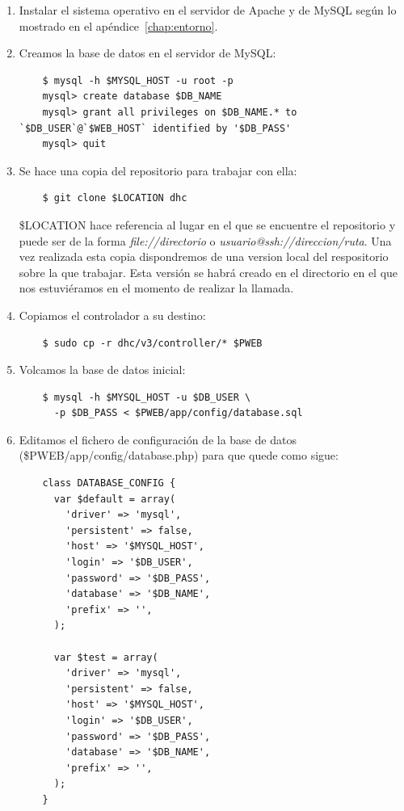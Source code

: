 \begin{enumerate}
	\item Instalar el sistema operativo en el servidor de Apache y de MySQL según lo mostrado en el apéndice~\ref{chap:entorno}.
	
	\item Creamos la base de datos en el servidor de MySQL:
	
	\begin{verbatim}
	$ mysql -h $MYSQL_HOST -u root -p
	mysql> create database $DB_NAME
	mysql> grant all privileges on $DB_NAME.* to `$DB_USER`@`$WEB_HOST` identified by '$DB_PASS'
	mysql> quit
	\end{verbatim}

	\item Se hace una copia del repositorio para trabajar con ella:
	
	\begin{verbatim}
	$ git clone $LOCATION dhc
	\end{verbatim}
	
	\$LOCATION hace referencia al lugar en el que se encuentre el repositorio y puede ser de la forma \emph{file://directorio} o \emph{usuario@ssh://direccion/ruta}. Una vez realizada esta copia dispondremos de una version local del respositorio sobre la que trabajar. Esta versión se habrá creado en el directorio en el que nos estuviéramos en el momento de realizar la llamada.

	\item Copiamos el controlador a su destino:
	
	\begin{verbatim}
	$ sudo cp -r dhc/v3/controller/* $PWEB
	\end{verbatim}
	
	\item Volcamos la base de datos inicial:
	
	\begin{verbatim}
	$ mysql -h $MYSQL_HOST -u $DB_USER \
	  -p $DB_PASS < $PWEB/app/config/database.sql
	\end{verbatim}
	
	\item Editamos el fichero de configuración de la base de datos (\$PWEB/app/config/database.php) para que quede como sigue:
	
	\begin{verbatim}
	class DATABASE_CONFIG {
	  var $default = array(
	    'driver' => 'mysql',
	    'persistent' => false,
	    'host' => '$MYSQL_HOST',
	    'login' => '$DB_USER',
	    'password' => '$DB_PASS',
	    'database' => '$DB_NAME',
	    'prefix' => '',
	  );

	  var $test = array(
	    'driver' => 'mysql',
	    'persistent' => false,
	    'host' => '$MYSQL_HOST',
	    'login' => '$DB_USER',
	    'password' => '$DB_PASS',
	    'database' => '$DB_NAME',
	    'prefix' => '',
	  );
	}
	\end{verbatim}
\end{enumerate}	

